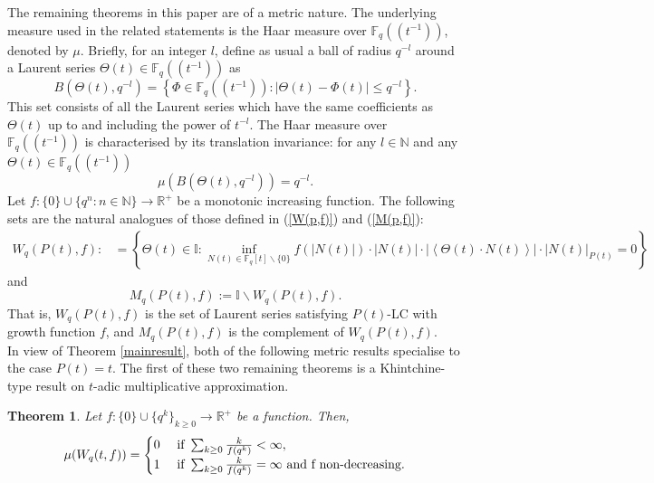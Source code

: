 \documentclass{article}
\newtheorem{theorem}{Theorem}[subsection]
\theoremstyle{definition}
\newcommand{\N}{\mathbb{N}}
\newcommand{\R}{\mathbb{R}}
\newcommand{\F}{\mathbb{F}}
\newcommand{\I}{\mathbb{I}}
\numberwithin{equation}{subsection}
\begin{document}
 \noindent The remaining theorems in this paper are of a metric nature. The underlying measure used in the related statements is the Haar measure over $\F_q\!\left(\!\left(t^{-1}\right)\!\right)$, denoted by $\mu$. Briefly, for an integer $l$, define as usual a ball of radius $q^{-l}$ around a Laurent series $\Theta(t)\in\F_q\!\left(\!\left(t^{-1}\right)\!\right)$ as \begin{equation}\label{ball}B\left(\Theta(t),q^{-l}\right)=\left\{\Phi\in\F_q\!\left(\!\left(t^{-1}\right)\!\right): |\Theta(t)-\Phi(t)|\le q^{-l}\right\}.\end{equation} This set consists of all the Laurent series which have the same coefficients as $\Theta(t)$ up to and including the power of $t^{-l}$. The Haar measure over $\F_q\!\left(\!\left(t^{-1}\right)\!\right)$ is characterised by its translation invariance: for any $l\in\N$ and any $\Theta(t)\in\F_q\!\left(\!\left(t^{-1}\right)\!\right)$  \begin{equation}\mu\left(\!B\!\left(\Theta(t),q^{-l}\right)\!\right)=q^{-l}.\label{Haar}\end{equation} Let $f:\{0\}\cup\{q^n:n\in\N\}\to\R^+$ be a monotonic increasing function. The following sets are the natural analogues of those defined in (\ref{W(p,f)}) and (\ref{M(p,f)}):\begin{align}\label{W_q(P(t),f)}
     W_q(P(t),f):&=\left\{\Theta(t)\in\mathbb{I}: \inf_{N(t)\in\F_q[t]\backslash\{0\}}f(|N(t)|)\cdot|N(t)|\cdot\left|\left\langle\Theta(t)\cdot N(t)\right\rangle\right|\cdot|N(t)|_{P(t)}=0\right\}
 \end{align} \noindent and \begin{equation}
     M_q(P(t),f):=\I\backslash W_q(P(t),f)\label{M_q(P(t),f)}.
 \end{equation} That is, $W_q(P(t),f)$ is the set of Laurent series satisfying $P(t)$-LC with growth function $f$, and $M_q(P(t),f)$ is the complement of $W_q(P(t),f)$. \\
 
 \noindent In view of Theorem \ref{mainresult}, both of the following metric results specialise to the case $P(t)=t$. The first of these two remaining theorems is a Khintchine-type result on $t$-adic multiplicative approximation. 
   \begin{theorem}
   \label{metric} Let $f:\{0\}\cup\{q^k\}_{k\ge0}\to\mathbb{R}^+$ be a function. Then, \begin{equation}\mu(W_q(t,f))=\begin{cases}0 & \text{ if }\sum_{k\ge0}\frac{k}{f(q^k)}<\infty,\\
   1 & \text{ if }\sum_{k\ge0}\frac{k}{f(q^k)}=\infty\text{ and }$f$\text{ non-decreasing}.
   \end{cases}\label{metsum}
    \end{equation}
\end{theorem}
\end{document}
